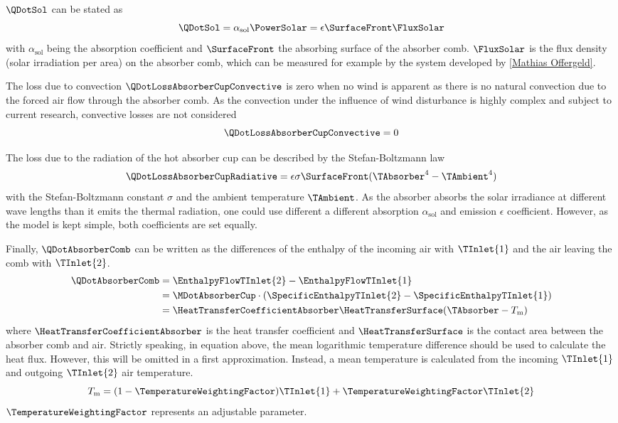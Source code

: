 \(\QDotSol\) can be stated as
\begin{equation}
\QDotSol = \alpha_{\mathrm{sol}} \PowerSolar =  \epsilon \SurfaceFront \FluxSolar
\end{equation}
with \(\alpha_{\mathrm{sol}}\) being the absorption coefficient and \(\SurfaceFront\) the absorbing surface of the absorber comb.
\(\FluxSolar\) is the flux density (solar irradiation per area) on the absorber comb, which can be measured for example by the system developed by \cref{Mathias Offergeld}.

The loss due to convection \(\QDotLossAbsorberCupConvective\) is zero when no wind is apparent as there is no natural convection due to the forced air flow through the absorber comb.
As the convection under the influence of wind disturbance is highly complex and subject to current research, convective losses are not considered
\begin{equation}
    \QDotLossAbsorberCupConvective = 0
\end{equation}

The loss due to the radiation of the hot absorber cup can be described by the Stefan-Boltzmann law
\begin{equation}
    \QDotLossAbsorberCupRadiative = \epsilon \sigma \SurfaceFront (\TAbsorber^4-\TAmbient^4)
\end{equation}
with the Stefan-Boltzmann constant \(\sigma\) and the ambient temperature \(\TAmbient\).
As the absorber absorbs the solar irradiance at different wave lengths than it emits the thermal radiation, one could use different a different absorption \(\alpha_{\mathrm{sol}}\) and emission \(\epsilon\) coefficient.
However, as the model is kept simple, both coefficients are set equally.

Finally, \(\QDotAbsorberComb\) can be written as the differences of the enthalpy of the incoming air with \(\TInlet{1}\) and the air leaving the comb with \(\TInlet{2}\).
\begin{align}
    \QDotAbsorberComb & = \EnthalpyFlowTInlet{2} - \EnthalpyFlowTInlet{1}                                   \\
& = \MDotAbsorberCup \cdot ( \SpecificEnthalpyTInlet{2} - \SpecificEnthalpyTInlet{1})\\
& = \HeatTransferCoefficientAbsorber \HeatTransferSurface (\TAbsorber-T_{\mathrm{m}})
\end{align}
where \(\HeatTransferCoefficientAbsorber\) is the heat transfer coefficient and \(\HeatTransferSurface\) is the contact area between the absorber comb and air.
Strictly speaking, in equation above, the mean logarithmic temperature difference should be used to calculate the heat flux.
However, this will be omitted in a first approximation.
Instead, a mean temperature is calculated from the incoming \(\TInlet{1}\) and outgoing  \(\TInlet{2}\) air temperature.
\begin{equation}
    T_{\mathrm{m}} = (1-\TemperatureWeightingFactor) \TInlet{1} + \TemperatureWeightingFactor \TInlet{2}
\end{equation}
\(\TemperatureWeightingFactor\) represents an adjustable parameter.

